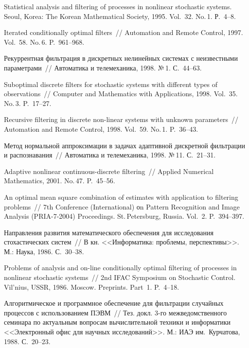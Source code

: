 \begin{multicols}{2}
{{\begin{thebibliography}{99}
Statistical analysis and filtering
of processes in nonlinear stochastic systems. Seoul, Korea: The Korean
Mathematical Society,  1995. Vol.~32. No.\,1. Р.~4--8.

Iterated conditionally optimal filters~//
Automation and Remote Control,  1997. Vol.~58. No.\,6.
P.~961--968.

Рекуррентная фильтрация в дискретных нелинейных системах с неизвестными
параметрами~// Автоматика и телемеханика, 1998. №\,1. С.~44--63.

 Suboptimal discrete filters for 
stochastic systems with different types of observations~// Computer and 
Mathematics with Applications,  1998. Vol.~35. No.\,3. P.~17--27.

Recursive
filtering in discrete non-linear systems with unknown
parameters~//  Automation and Remote Control, 1998.
Vol.~59. No.\,1. P.~36--43.

Метод нормальной аппроксимации в задачах адаптивной дискретной фильтрации и
распознавания~//  Автоматика и телемеханика, 1998. №\,11. С.~21--31.

 Adaptive nonlinear continuous-discrete 
filtering~// Applied Numerical Mathematics,  2001. No.\,47. P.~45--56.

 An optimal mean square combination of estimates with application to
filtering problems~// 7th Conference (International) оn
Pattern Recognition and Image Analysis (PRIA-7-2004) Proceedings.
St.\,Petersburg, Russia. Vol.~2. P.~394--397.

Направления развития
математического обеспечения для исследования стохастических
систем~// В кн. <<Информатика: проблемы, перспективы>>.  М.:
Наука, 1986. С.~30--38.

Problems of analysis and on-line
conditionally optimal filtering of processes in nonlinear
stochastic systems~// 2nd IFAC  Symposium on
Stochastic Control. Vil'nius, USSR,  1986. Moscow.
Preprints. Part~1. P.~4--18.

Алгоритмическое и
программное обеспечение для фильтрации случайных процессов с
использованием ПЭВМ~// Тез. докл. 3-го межведомственного семинара по
актуальным вопросам вычислительной техники и информатики
<<Электронный офис для научных исследований>>. М.: ИАЭ
им.~Курчатова, 1988. С.~20--23.


\end{thebibliography}}}
\end{multicols}
